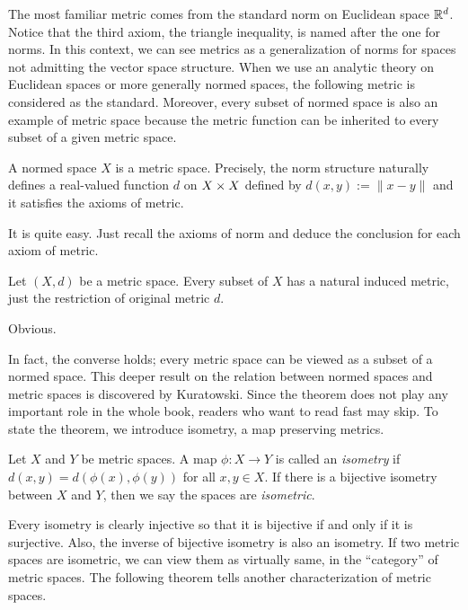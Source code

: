 \documentclass{../crs}
\begin{document}
The most familiar metric comes from the standard norm on Euclidean space $\mathbb{R}^d$.
Notice that the third axiom, the triangle inequality, is named after the one for norms.
In this context, we can see metrics as a generalization of norms for spaces not admitting the vector space structure.
When we use an analytic theory on Euclidean spaces or more generally normed spaces, the following metric is considered as the standard.
Moreover, every subset of normed space is also an example of metric space because the metric function can be inherited to every subset of a given metric space.

\begin{ex}
A normed space $X$ is a metric space.
Precisely, the norm structure naturally defines a real-valued function $d$ on $X\times X$ defined by $d(x,y):=\|x-y\|$ and it satisfies the axioms of metric.
\end{ex}
\begin{pf}
It is quite easy.
Just recall the axioms of norm and deduce the conclusion for each axiom of metric.
\end{pf}
\begin{ex}
Let $(X,d)$ be a metric space.
Every subset of $X$ has a natural induced metric, just the restriction of original metric $d$.
\end{ex}
\begin{pf}
Obvious.
\end{pf}

In fact, the converse holds; every metric space can be viewed as a subset of a normed space.
This deeper result on the relation between normed spaces and metric spaces is discovered by Kuratowski.
Since the theorem does not play any important role in the whole book, readers who want to read fast may skip.
To state the theorem, we introduce isometry, a map preserving metrics.

\begin{defn}
Let $X$ and $Y$ be metric spaces.
A map $\phi:X\to Y$ is called an \emph{isometry} if $d(x,y)=d(\phi(x),\phi(y))$ for all $x,y\in X$.
If there is a bijective isometry between $X$ and $Y$, then we say the spaces are \emph{isometric}.
\end{defn}

Every isometry is clearly injective so that it is bijective if and only if it is surjective.
Also, the inverse of bijective isometry is also an isometry.
If two metric spaces are isometric, we can view them as virtually same, in the ``category'' of metric spaces.
The following theorem tells another characterization of metric spaces.
\end{document}
